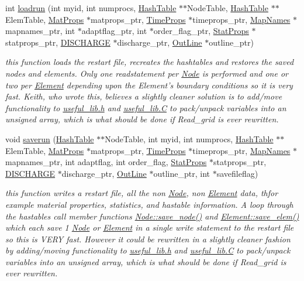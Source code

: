 \begin{CompactItemize}
\item 
int \hyperlink{restart_8C_a1}{loadrun} (int myid, int numprocs, \hyperlink{classHashTable}{Hash\-Table} $\ast$$\ast$Node\-Table, \hyperlink{classHashTable}{Hash\-Table} $\ast$$\ast$Elem\-Table, \hyperlink{structMatProps}{Mat\-Props} $\ast$matprops\_\-ptr, \hyperlink{structTimeProps}{Time\-Props} $\ast$timeprops\_\-ptr, \hyperlink{structMapNames}{Map\-Names} $\ast$mapnames\_\-ptr, int $\ast$adaptflag\_\-ptr, int $\ast$order\_\-flag\_\-ptr, \hyperlink{structStatProps}{Stat\-Props} $\ast$statprops\_\-ptr, \hyperlink{structDISCHARGE}{DISCHARGE} $\ast$discharge\_\-ptr, \hyperlink{structOutLine}{Out\-Line} $\ast$outline\_\-ptr)
\begin{CompactList}\small\item\em this function loads the restart file, recreates the hashtables and restores the saved nodes and elements. Only one readstatement per \hyperlink{classNode}{Node} is performed and one or two per \hyperlink{classElement}{Element} depending upon the Element's boundary conditions so it is very fast. Keith, who wrote this, believes a slightly cleaner solution is to add/move functionality to \hyperlink{useful__lib_8h}{useful\_\-lib.h} and \hyperlink{constant_8h_a21}{useful\_\-lib.C} to pack/unpack variables into an unsigned array, which is what should be done if Read\_\-grid is ever rewritten. \item\end{CompactList}\item 
void \hyperlink{restart_8C_a2}{saverun} (\hyperlink{classHashTable}{Hash\-Table} $\ast$$\ast$Node\-Table, int myid, int numprocs, \hyperlink{classHashTable}{Hash\-Table} $\ast$$\ast$Elem\-Table, \hyperlink{structMatProps}{Mat\-Props} $\ast$matprops\_\-ptr, \hyperlink{structTimeProps}{Time\-Props} $\ast$timeprops\_\-ptr, \hyperlink{structMapNames}{Map\-Names} $\ast$mapnames\_\-ptr, int adaptflag, int order\_\-flag, \hyperlink{structStatProps}{Stat\-Props} $\ast$statprops\_\-ptr, \hyperlink{structDISCHARGE}{DISCHARGE} $\ast$discharge\_\-ptr, \hyperlink{structOutLine}{Out\-Line} $\ast$outline\_\-ptr, int $\ast$savefileflag)
\begin{CompactList}\small\item\em this function writes a restart file, all the non \hyperlink{classNode}{Node}, non \hyperlink{classElement}{Element} data, thfor example material properties, statistics, and hastable information. A loop through the hastables call member functions \hyperlink{classNode_a6}{Node::save\_\-node()} and \hyperlink{classElement_a6}{Element::save\_\-elem()} which each save 1 \hyperlink{classNode}{Node} or \hyperlink{classElement}{Element} in a single write statement to the restart file so this is VERY fast. However it could be rewritten in a slightly cleaner fashion by adding/moving functionality to \hyperlink{useful__lib_8h}{useful\_\-lib.h} and \hyperlink{constant_8h_a21}{useful\_\-lib.C} to pack/unpack variables into an unsigned array, which is what should be done if Read\_\-grid is ever rewritten. \item\end{CompactList}\end{CompactItemize}


